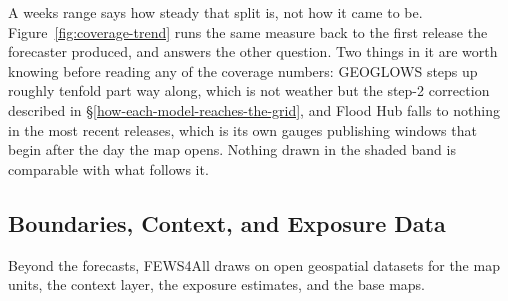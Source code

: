 

A week\textquotesingle s range says how steady that split is, not how it came to be.
Figure~\ref{fig:coverage-trend} runs the same measure back to the first release the forecaster produced, and answers the other question.
Two things in it are worth knowing before reading any of the coverage numbers: GEOGLOWS steps up roughly tenfold part way along, which is not weather but the step-2 correction described in \S\ref{how-each-model-reaches-the-grid}, and Flood Hub falls to nothing in the most recent releases, which is its own gauges publishing windows that begin after the day the map opens.
Nothing drawn in the shaded band is comparable with what follows it.



\subsection{Boundaries, Context, and Exposure Data}\label{boundaries-context-and-exposure-data}

Beyond the forecasts, FEWS4All draws on open geospatial datasets for the map units, the context layer, the exposure estimates, and the base maps.

